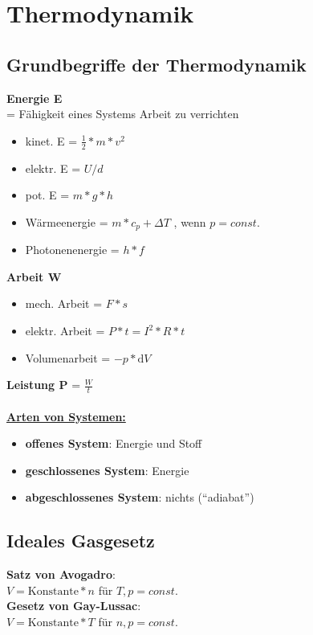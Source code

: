 \chapter{Thermodynamik}
\section{Grundbegriffe der Thermodynamik}
\textbf{Energie E}\\
= Fähigkeit eines Systems Arbeit zu verrichten
\begin{itemize}
	\item kinet. E = $\frac{1}{2}*m*v^2$
	\item elektr. E = $U/d$
	\item pot. E = $m*g*h$
	\item Wärmeenergie = $m*c_p+\Delta T$ , wenn $p=const.$
	\item Photonenenergie = $h*f$
\end{itemize}

\textbf{Arbeit W}
\begin{itemize}
	\item mech. Arbeit = $F*s$
	\item elektr. Arbeit = $P*t=I^2*R*t$
	\item Volumenarbeit = $-p*\text{d}V$
\end{itemize}

\textbf{Leistung P} = $\frac{W}{t}$\\ \\

\textbf{\underline{Arten von Systemen:}}
\begin{itemize}
	\item \textbf{offenes System}: Energie und Stoff
	\item  \textbf{geschlossenes System}: Energie
	\item  \textbf{abgeschlossenes System}: nichts ("`adiabat"') 
\end{itemize}

\section{Ideales Gasgesetz}
\textbf{Satz von Avogadro}: \\
$V=\text{Konstante}*n$ für $T,p = const.$\\

\textbf{Gesetz von Gay-Lussac}: \\
$V=\text{Konstante}*T$ für $n,p = const.$\\

